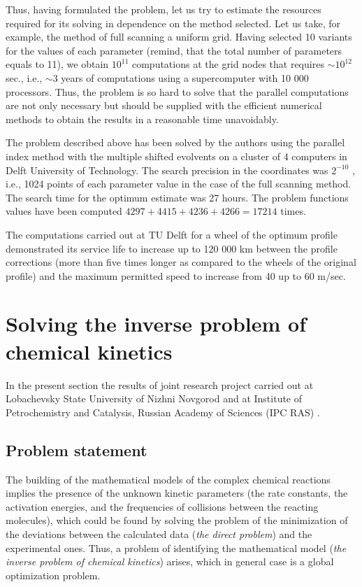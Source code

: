 Thus, having formulated the problem, let us try to estimate the resources required for its solving in dependence on the method selected. Let us take, for example, the method of full scanning a uniform grid. Having selected 10 variants for the values of each parameter (remind, that the total number of parameters equals to 11), we obtain $10^{11}$ computations at the grid nodes that requires $\sim 10^{12}$ sec., i.e., $\sim 3$ years of computations using a supercomputer with 10 000 processors. Thus, the problem is so hard to solve that the parallel computations are not only necessary but should be supplied with the efficient numerical methods to obtain the results in a reasonable time unavoidably.

The problem described above has been solved by the authors using the parallel index method with the multiple shifted evolvents on a cluster of 4 computers in Delft University of Technology. The search precision in the coordinates was $2^{-10}$ , i.e., 1024 points of each parameter value in the case of the full scanning method. The search time for the optimum estimate was 27 hours. The problem functions values have been computed $4297 + 4415 + 4236 + 4266 = 17214$ times.

The computations carried out at TU Delft for a wheel of the optimum profile demonstrated its service life to increase up to 120 000 km between the profile corrections (more than five times longer as compared to the wheels of the original profile) and the maximum permitted speed to increase from 40 up to 60 m/sec.

\section{Solving the inverse problem of chemical kinetics}

In the present section the results of joint research project carried out at Lobachevsky State University of Nizhni Novgorod and at Institute of Petrochemistry and Catalysis, Russian Academy of Sciences (IPC RAS) \cite{8_Gubaidullin2011}.

\subsection{Problem statement}

The building of the mathematical models of the complex chemical reactions implies the presence of the unknown kinetic parameters (the rate constants, the activation energies, and the frequencies of collisions between the reacting molecules), which could be found by solving the problem of the minimization of the deviations between the calculated data (\textit{the direct problem}) and the experimental ones. Thus, a problem of identifying the mathematical model (\textit{the inverse problem of chemical kinetics}) arises, which in general case is a global optimization problem.

